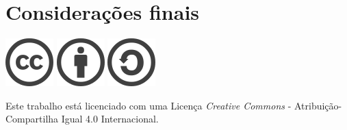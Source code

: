 \documentclass[12pt]{article}
\newcommand\tab[1][1cm]{\hspace*{#1}}
\begin{document}
\newpage

\section{Considerações finais}
\hspace{5cm}
\begin{center}
    \includegraphics{licence/cc_logo.png}
    \includegraphics{licence/cc_by.png}
    \includegraphics{licence/cc_sa.png}
    
    \par\tab Este trabalho está licenciado com uma Licença \textit{Creative Commons} - Atribuição-Compartilha Igual 4.0 Internacional\cite{licence:cc_by_sa}.
\end{center}

\newpage



\end{document}
